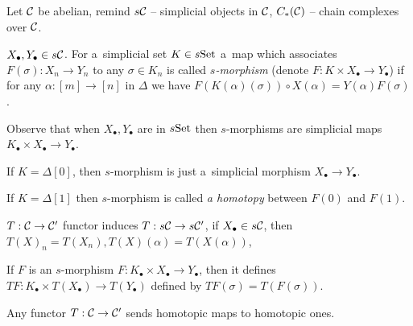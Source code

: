 



    Let $\mathcal{C}$ be abelian,
    remind $s\mathcal{C}$ -- simplicial objects in $\mathcal{C}$,
    $C_\ast(\mathcal{C})$ -- chain complexes over $\mathcal{C}$.
    
    \begin{definition}[$s$-morphism]
        $X_\bullet, Y_\bullet \in s\mathcal{C}$. For a~simplicial set $K \in s\mathrm{Set}$
        a~map which associates $F(\sigma):X_n \to Y_n$
        to any $\sigma \in K_n$ is called {\em $s$-morphism}
        (denote $F:K \times X_\bullet \to Y_\bullet$)
        if for any $\alpha:[m]\to[n]$ in $\Delta$ we have
        $F(K(\alpha)(\sigma)) \circ X(\alpha) = Y(\alpha) F(\sigma)$.
        
        Observe that when $X_\bullet, Y_\bullet$ are in $s\mathrm{Set}$ then
        $s$-morphisms are simplicial maps 
        $K_\bullet \times X_\bullet \to Y_\bullet$.
    \end{definition}
    
    \begin{example}
        If $K=\Delta[0]$, then $s$-morphism 
        is just a~simplicial morphism $X_\bullet \to Y_\bullet$.
    \end{example}
    
    \begin{example}
        If $K=\Delta[1]$ then $s$-morphism is called
        {\em a homotopy} between $F(0)$ and $F(1)$.
    \end{example}
    
    \begin{remark}
        $T:\mathcal{C} \to \mathcal{C}'$ functor
        induces $T:s\mathcal{C} \to s\mathcal{C}'$, 
        if $X_\bullet \in s\mathcal{C}$, then
        $T(X)_n = T(X_n), T(X)(\alpha) = T(X(\alpha))$,
    \end{remark}
    
    \begin{definition}
        If $F$ is an $s$-morphism 
        $F:K_\bullet \times X_\bullet \to Y_\bullet$,
        then it defines 
        $TF:K_\bullet \times T(X_\bullet) \to T(Y_\bullet)$
        defined by $TF(\sigma) = T(F(\sigma))$.
    \end{definition}
    
    \begin{remark}
        Any functor $T:\mathcal{C} \to \mathcal{C}'$ sends homotopic maps
        to homotopic ones.
    \end{remark}

